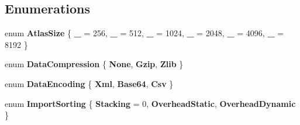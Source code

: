 \subsection*{Enumerations}
\begin{DoxyCompactItemize}
\item 
\mbox{\label{namespace_super_tiled2_unity_1_1_editor_a618b13d0f99cb71fd5b219833f715fda}} 
enum {\bfseries Atlas\+Size} \{ \newline
{\bfseries \+\_} = 256, 
{\bfseries \+\_} = 512, 
{\bfseries \+\_} = 1024, 
{\bfseries \+\_} = 2048, 
\newline
{\bfseries \+\_} = 4096, 
{\bfseries \+\_} = 8192
 \}
\item 
\mbox{\label{namespace_super_tiled2_unity_1_1_editor_a1de7135a180a98304d981851a471d52c}} 
enum {\bfseries Data\+Compression} \{ {\bfseries None}, 
{\bfseries Gzip}, 
{\bfseries Zlib}
 \}
\item 
\mbox{\label{namespace_super_tiled2_unity_1_1_editor_a5b03b41af633febc26b7a49590d35923}} 
enum {\bfseries Data\+Encoding} \{ {\bfseries Xml}, 
{\bfseries Base64}, 
{\bfseries Csv}
 \}
\item 
\mbox{\label{namespace_super_tiled2_unity_1_1_editor_ad154ac49c69567324320ac280107ce7a}} 
enum {\bfseries Import\+Sorting} \{ {\bfseries Stacking} = 0, 
{\bfseries Overhead\+Static}, 
{\bfseries Overhead\+Dynamic}
 \}
\end{DoxyCompactItemize}
